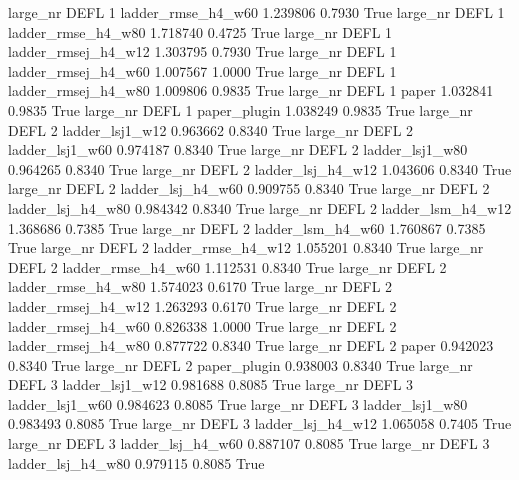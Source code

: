   large_nr     DEFL                 1  ladder_rmse_h4_w60    1.239806      0.7930    True
  large_nr     DEFL                 1  ladder_rmse_h4_w80    1.718740      0.4725    True
  large_nr     DEFL                 1 ladder_rmsej_h4_w12    1.303795      0.7930    True
  large_nr     DEFL                 1 ladder_rmsej_h4_w60    1.007567      1.0000    True
  large_nr     DEFL                 1 ladder_rmsej_h4_w80    1.009806      0.9835    True
  large_nr     DEFL                 1               paper    1.032841      0.9835    True
  large_nr     DEFL                 1        paper_plugin    1.038249      0.9835    True
  large_nr     DEFL                 2     ladder_lsj1_w12    0.963662      0.8340    True
  large_nr     DEFL                 2     ladder_lsj1_w60    0.974187      0.8340    True
  large_nr     DEFL                 2     ladder_lsj1_w80    0.964265      0.8340    True
  large_nr     DEFL                 2   ladder_lsj_h4_w12    1.043606      0.8340    True
  large_nr     DEFL                 2   ladder_lsj_h4_w60    0.909755      0.8340    True
  large_nr     DEFL                 2   ladder_lsj_h4_w80    0.984342      0.8340    True
  large_nr     DEFL                 2   ladder_lsm_h4_w12    1.368686      0.7385    True
  large_nr     DEFL                 2   ladder_lsm_h4_w60    1.760867      0.7385    True
  large_nr     DEFL                 2  ladder_rmse_h4_w12    1.055201      0.8340    True
  large_nr     DEFL                 2  ladder_rmse_h4_w60    1.112531      0.8340    True
  large_nr     DEFL                 2  ladder_rmse_h4_w80    1.574023      0.6170    True
  large_nr     DEFL                 2 ladder_rmsej_h4_w12    1.263293      0.6170    True
  large_nr     DEFL                 2 ladder_rmsej_h4_w60    0.826338      1.0000    True
  large_nr     DEFL                 2 ladder_rmsej_h4_w80    0.877722      0.8340    True
  large_nr     DEFL                 2               paper    0.942023      0.8340    True
  large_nr     DEFL                 2        paper_plugin    0.938003      0.8340    True
  large_nr     DEFL                 3     ladder_lsj1_w12    0.981688      0.8085    True
  large_nr     DEFL                 3     ladder_lsj1_w60    0.984623      0.8085    True
  large_nr     DEFL                 3     ladder_lsj1_w80    0.983493      0.8085    True
  large_nr     DEFL                 3   ladder_lsj_h4_w12    1.065058      0.7405    True
  large_nr     DEFL                 3   ladder_lsj_h4_w60    0.887107      0.8085    True
  large_nr     DEFL                 3   ladder_lsj_h4_w80    0.979115      0.8085    True
